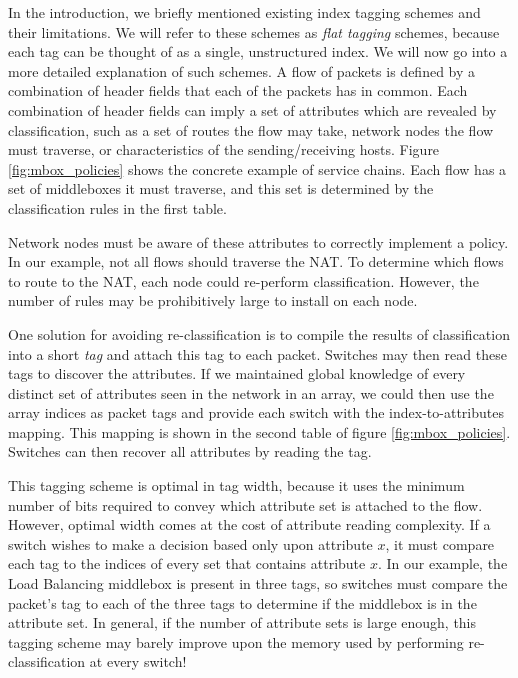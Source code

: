 \begin{itemize}
{In the introduction, we briefly mentioned existing index tagging schemes and their limitations. We will refer to these schemes as \textit{flat tagging} schemes, because each tag can be thought of as a single, unstructured index.  We will now go into a more detailed explanation of such schemes. A flow of packets is defined by a combination of header fields that each of the packets has in common. Each combination of header fields can imply a set of attributes which are revealed by classification, such as a set of routes the flow may take, network nodes the flow must traverse, or characteristics of the sending/receiving hosts. Figure \ref{fig:mbox_policies} shows the concrete example of service chains. Each flow has a set of middleboxes it must traverse, and this set is determined by the classification rules in the first table.

Network nodes must be aware of these attributes to correctly implement a policy. In our example, not all flows should traverse the NAT. To determine which flows to route to the NAT, each node could re-perform classification. However, the number of rules may be prohibitively large to install on each node. 

One solution for avoiding re-classification is to compile the results of classification into a short \textit{tag} and attach this tag to each packet. Switches may then read these tags to discover the attributes. If we maintained global knowledge of every distinct set of attributes seen in the network in an array, we could then use the array indices as packet tags and provide each switch with the index-to-attributes mapping. This mapping is shown in the second table of figure \ref{fig:mbox_policies}. Switches can then recover all attributes by reading the tag. 


This tagging scheme is optimal in tag width, because it uses the minimum number of bits required to convey which attribute set is attached to the flow. However, optimal width comes at the cost of attribute reading complexity. If a switch wishes to make a decision based only upon attribute $x$, it must compare each tag to the indices of every set that contains attribute $x$. In our example, the Load Balancing middlebox is present in three tags, so switches must compare the packet's tag to each of the three tags to determine if the middlebox is in the attribute set. In general, if the number of attribute sets is large enough, this tagging scheme may barely improve upon the memory used by performing re-classification at every switch!

}
\end{itemize}
